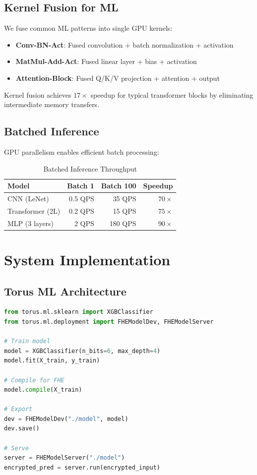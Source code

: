 \documentclass{../shared/luxfhe}
\begin{document}
\subsection{Kernel Fusion for ML}

We fuse common ML patterns into single GPU kernels:

\begin{itemize}[noitemsep]
    \item \textbf{Conv-BN-Act}: Fused convolution + batch normalization + activation
    \item \textbf{MatMul-Add-Act}: Fused linear layer + bias + activation
    \item \textbf{Attention-Block}: Fused Q/K/V projection + attention + output
\end{itemize}

Kernel fusion achieves $17\times$ speedup for typical transformer blocks by eliminating intermediate memory transfers.

\subsection{Batched Inference}

GPU parallelism enables efficient batch processing:

\begin{table}[h]
\centering
\caption{Batched Inference Throughput}
\begin{tabular}{lrrr}
\toprule
Model & Batch 1 & Batch 100 & Speedup \\
\midrule
CNN (LeNet) & 0.5 QPS & 35 QPS & $70\times$ \\
Transformer (2L) & 0.2 QPS & 15 QPS & $75\times$ \\
MLP (3 layers) & 2 QPS & 180 QPS & $90\times$ \\
\bottomrule
\end{tabular}
\end{table}

\section{System Implementation}

\subsection{Torus ML Architecture}

\begin{lstlisting}[language=Python,caption=Torus ML API]
from torus.ml.sklearn import XGBClassifier
from torus.ml.deployment import FHEModelDev, FHEModelServer

# Train model
model = XGBClassifier(n_bits=6, max_depth=4)
model.fit(X_train, y_train)

# Compile for FHE
model.compile(X_train)

# Export
dev = FHEModelDev("./model", model)
dev.save()

# Serve
server = FHEModelServer("./model")
encrypted_pred = server.run(encrypted_input)
\end{lstlisting}
\end{document}
